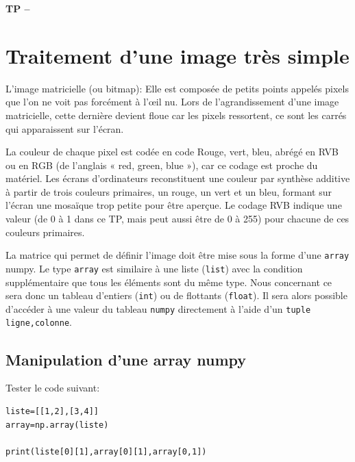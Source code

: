 

%





\begin{center}
{\Large\bf TP \no {\numero} -- \descrip}
\end{center}


\section{Traitement d'une image très simple}

L’image matricielle (ou bitmap): Elle est composée de petits points appelés \og pixels \fg que l’on ne voit pas forcément à l’\oe il nu. Lors de l’agrandissement d’une image matricielle, cette dernière devient floue car les pixels ressortent, ce sont les carrés qui apparaissent sur l’écran.

La couleur de chaque pixel est codée en code Rouge, vert, bleu, abrégé en RVB ou en RGB (de l'anglais « red, green, blue »), car ce codage est proche du matériel. Les écrans d'ordinateurs reconstituent une couleur par synthèse additive à partir de trois couleurs primaires, un rouge, un vert et un bleu, formant sur l'écran une mosaïque trop petite pour être aperçue. Le codage RVB indique une valeur (de 0 à 1 dans ce TP, mais peut aussi être de 0 à 255) pour chacune de ces couleurs primaires. 

La matrice qui permet de définir l'image doit être mise sous la forme d'une \verb?array? numpy. Le type \verb?array? est similaire à une liste (\verb?list?) avec la condition supplémentaire que tous les éléments sont du même type. Nous concernant ce sera donc un tableau d’entiers (\verb?int?) ou de flottants (\verb?float?). Il sera alors possible d'accéder à une valeur du tableau \verb?numpy? directement à l'aide d'un \verb?tuple? \verb?ligne,colonne?.

\subsection{Manipulation d'une array numpy}

Tester le code suivant:

\begin{verbatim}
liste=[[1,2],[3,4]]
array=np.array(liste)

print(liste[0][1],array[0][1],array[0,1])
\end{verbatim}


